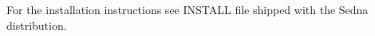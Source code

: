 \documentclass[a4paper,12pt]{article}
\begin{document}
For the installation instructions see INSTALL file shipped with the Sedna distribution.


\end{document}
